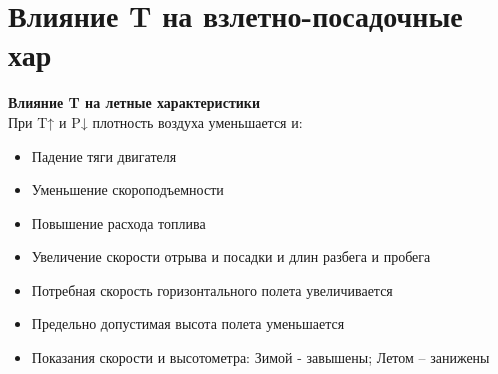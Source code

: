 
\section{Влияние T на взлетно-посадочные хар}
\textbf{Влияние T на летные характеристики}\\
При T↑ и P↓ плотность воздуха уменьшается и:
\begin{itemize}
	\item Падение тяги двигателя
	\item Уменьшение скороподъемности
	\item Повышение расхода топлива
	\item Увеличение скорости отрыва и посадки и длин разбега и пробега
	\item Потребная скорость горизонтального полета увеличивается
	\item Предельно допустимая высота полета уменьшается 
	\item Показания скорости и высотометра:  	Зимой -  завышены; Летом – занижены
\end{itemize}
